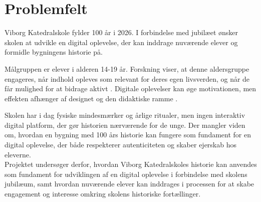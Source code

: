 \section{Problemfelt}

Viborg Katedralskole fylder 100 år i 2026. I forbindelse med jubilæet ønsker skolen at udvikle en digital oplevelse, der kan inddrage nuværende elever og formidle bygningens historie på.

Målgruppen er elever i alderen 14-19 år. Forskning viser, at denne aldersgruppe engageres, når indhold opleves som relevant for deres egen livsverden, og når de får mulighed for at bidrage aktivt \cite{VanDoorsselaere2025}. Digitale oplevelser kan øge motivationen, men effekten afhænger af designet og den didaktiske ramme \cite{Wouters2013, Mayer2022}.

Skolen har i dag fysiske mindesmærker og årlige ritualer,\cite{katedralskole2026} men ingen interaktiv digital platform, der gør historien nærværende for de unge. Der mangler viden om, hvordan en bygning med 100 års historie kan fungere som fundament for en digital oplevelse, der både respekterer autenticiteten og skaber ejerskab hos eleverne. \\

Projektet undersøger derfor, hvordan Viborg Katedralskoles historie kan anvendes som fundament for udviklingen af en digital oplevelse i forbindelse med skolens jubilæum, samt hvordan nuværende elever kan inddrages i processen for at skabe engagement og interesse omkring skolens historiske fortællinger.


